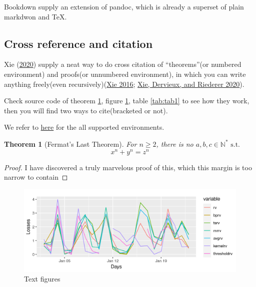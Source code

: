 \documentclass[AutoFakeBold,AutoFakeSlant,scheme=plain,degree=bachelor,zihao=-4]{sustechthesis}
\newtheorem{theorem}{Theorem}[section]
\theoremstyle{definition}
\theoremstyle{definition}
\theoremstyle{definition}
\theoremstyle{definition}
\theoremstyle{remark}
\begin{document}
Bookdown supply an extension of pandoc, which is already a superset of plain markdwon and TeX.

\hypertarget{cross-reference-and-citation}{%
\subsection{Cross reference and citation}\label{cross-reference-and-citation}}

Xie (\protect\hyperlink{ref-R-bookdown}{2020}) supply a neat way to do cross citation of ``theorems''(or numbered environment) and proofs(or unnumbered environment), in which you can write anything freely(even recursively)(\protect\hyperlink{ref-bookdown2016}{Xie 2016}; \protect\hyperlink{ref-rmarkdown2020}{Xie, Dervieux, and Riederer 2020}).

Check source code of theorem \ref{thm:t1}, figure \ref{fig:fig1}, table \ref{tab:tab1} to see how they work, then you will find two ways to cite(bracketed or not).

We refer to \href{https://bookdown.org/yihui/bookdown/markdown-extensions-by-bookdown.html\#theorems}{here} for the all supported environments.

\begin{theorem}[Fermat's Last Theorem]
\protect\hypertarget{thm:t1}{}\label{thm:t1}For \(n\ge 2\), there is no \(a,b,c\in \mathbb{N}^* \text{ s.t. }\)
\[
x^{n}+y^{n}=z^{n}
\]
\end{theorem}

\begin{proof}
I have discovered a truly marvelous proof of this, which this margin is too narrow to contain
\end{proof}

\begin{figure}

{\centering \includegraphics[width=0.7\linewidth]{figures/example-image-a} 

}

\caption{Text figures}\label{fig:fig1}
\end{figure}
\end{document}
